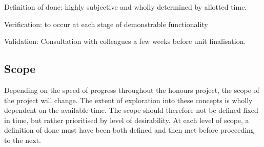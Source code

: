Definition of done: highly subjective and wholly determined by allotted time.

Verification: to occur at each stage of demonstrable functionality

Validation: Consultation with colleagues a few weeks before unit finalisation.

\subsection{Scope}

Depending on the speed of progress throughout the honours project, the scope of the project will change. The extent of exploration into these concepts is wholly dependent on the available time. The scope should therefore not be defined fixed in time, but rather prioritised by level of desirability. At each level of scope, a definition of done must have been both defined and then met before proceeding to the next.

